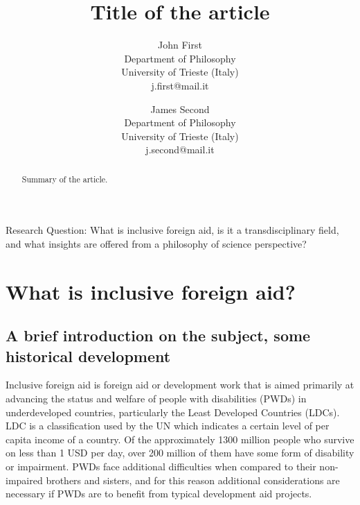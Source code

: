 \documentclass[a4paper]{article}
\begin{document}
\title{Title of the article}
\author{John First\\Department of Philosophy\\University of Trieste (Italy)\\j.first@mail.it \and%
            James Second\\Department of Philosophy\\University of Trieste (Italy)\\j.second@mail.it}

\maketitle
\newpage

Research Question: What is inclusive foreign aid, is it a transdisciplinary field, and what
insights are offered from a philosophy of science perspective?

\tableofcontents



\begin{abstract}
Summary of the article.
\end{abstract}
\newpage




\section{What is inclusive foreign aid?}

\subsection{A brief introduction on the subject, some historical development}

Inclusive foreign aid is foreign aid or development work that is aimed
primarily at advancing the status and welfare of people with disabilities
(PWDs) in underdeveloped countries, particularly the Least Developed Countries
(LDCs). LDC is a classification used by the UN which indicates a certain level
of per capita income of a country. Of the approximately 1300 million people
who survive on less than 1 USD per day, over 200 million of them have some
form of disability or impairment. PWDs face additional difficulties when
compared to their non-impaired brothers and sisters, and for this reason
additional considerations are necessary if PWDs are to benefit from typical
development aid projects. 
\end{document}
